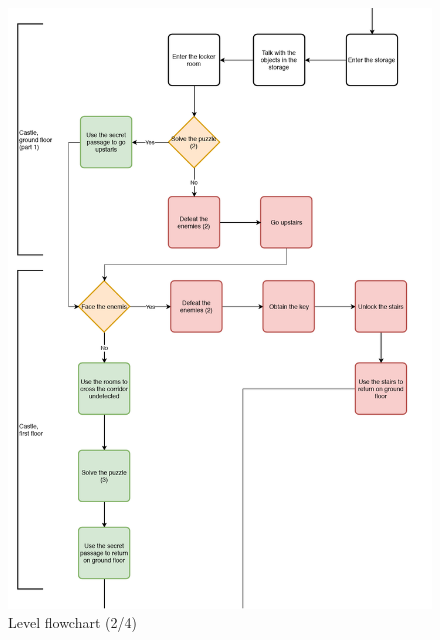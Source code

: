 \begin{figure}[H]
  \centering
  \includegraphics[width=13cm]{Images/Diagrams/dynamia_2}
  \caption{Level flowchart (2/4)}
\end{figure}

